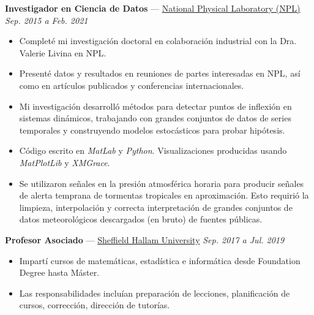 \documentclass[10pt]{article}
\newenvironment{innerlist}[1][\enskip\textbullet]{
	\begin{itemize}[#1,leftmargin=*,parsep=0pt,itemsep=1pt,topsep=2pt,partopsep=0pt]
}{\end{itemize}}
\begin{document}
\vspace{14pt}
\textbf{Investigador en Ciencia de Datos} — \href{http://www.npl.co.uk}{National Physical Laboratory (NPL)} \hfill \emph{Sep. 2015 a Feb. 2021} \\
\vspace{-6pt}
\begin{innerlist}
	\item Completé mi investigación doctoral en colaboración industrial
		con la Dra. Valerie Livina en NPL.
	\item Presenté datos y resultados en reuniones de partes interesadas en NPL,
		así como en artículos publicados y conferencias internacionales.
	\item Mi investigación desarrolló métodos para detectar puntos de inflexión en sistemas dinámicos,
		trabajando con grandes conjuntos de datos de series temporales
		y construyendo modelos estocásticos para probar hipótesis.
	\item Código escrito en \textit{MatLab} y \textit{Python}. Visualizaciones producidas
		usando \textit{MatPlotLib} y \textit{XMGrace}.
	\item Se utilizaron señales en la presión atmosférica horaria para producir señales de alerta temprana
		de tormentas tropicales en aproximación. Esto requirió la limpieza, interpolación y
		correcta interpretación de grandes conjuntos de datos meteorológicos descargados (en bruto) de
		fuentes públicas.

\end{innerlist}

\vspace{14pt}

\textbf{Profesor Asociado} — \href{https://www.shu.ac.uk/about-us/academic-departments/engineering-and-mathematics}{Sheffield Hallam University} \hfill \emph{Sep. 2017 a Jul. 2019} \\
\vspace{-6pt}
\begin{innerlist}
	\item Impartí cursos de matemáticas, estadística e informática desde Foundation Degree hasta Máster.
	\item Las responsabilidades incluían preparación de lecciones, planificación de cursos, corrección, dirección de tutorías.
\end{innerlist}
\vspace{10pt}
\end{document}
